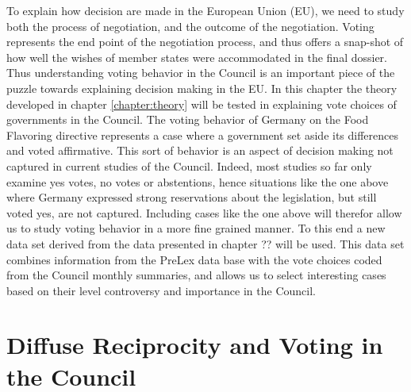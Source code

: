 To explain how decision are made in the European Union (EU), we need to study both the process of negotiation, and the   outcome of the negotiation. Voting represents the end point of the negotiation process, and thus offers a snap-shot of how well the wishes of member states were accommodated in the final dossier. Thus understanding voting behavior in the Council is an important piece of the puzzle towards explaining decision making in the EU. In this chapter the theory developed in chapter \ref{chapter:theory} will be tested in explaining vote choices of governments in the Council. The voting behavior of Germany on the Food Flavoring directive represents a case where a government set aside its differences and voted affirmative. This sort of behavior is an aspect of decision making not captured in current studies of the Council. Indeed, most studies so far only examine yes votes, no votes or abstentions, hence situations like the one above where Germany expressed strong reservations about the legislation, but still voted yes, are not captured. Including cases like the one above will therefor allow us to study voting behavior in a more fine grained manner. To this end a new data set derived from the data presented in chapter ?? will be used. This data set combines information from the PreLex data base with the vote choices coded from the Council monthly summaries, and allows us to select interesting cases based on their level controversy and importance in the Council. 


\section{Diffuse Reciprocity and Voting in the Council}

